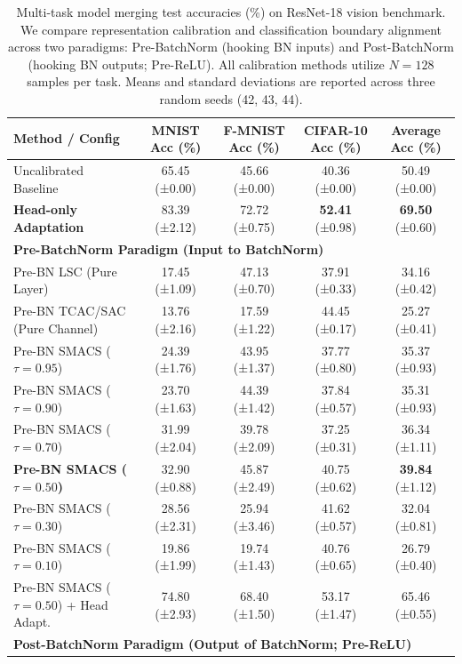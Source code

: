 \documentclass{article}
\theoremstyle{plain}
\theoremstyle{definition}
\theoremstyle{remark}
\begin{document}
\begin{table}[t]
\caption{Multi-task model merging test accuracies (\%) on ResNet-18 vision benchmark. We compare representation calibration and classification boundary alignment across two paradigms: Pre-BatchNorm (hooking BN inputs) and Post-BatchNorm (hooking BN outputs; Pre-ReLU). All calibration methods utilize $N=128$ samples per task. Means and standard deviations are reported across three random seeds (42, 43, 44).}
\label{tab:results}
\begin{center}
\begin{small}
\begin{sc}
\begin{tabular}{lcccc}
\toprule
Method / Config & MNIST Acc (\%) & F-MNIST Acc (\%) & CIFAR-10 Acc (\%) & Average Acc (\%) \\
\midrule
Uncalibrated Baseline & 65.45 (±0.00) & 45.66 (±0.00) & 40.36 (±0.00) & 50.49 (±0.00) \\
\textbf{Head-only Adaptation} & 83.39 (±2.12) & 72.72 (±0.75) & \textbf{52.41} (±0.98) & \textbf{69.50} (±0.60) \\
\midrule
\multicolumn{5}{l}{\textbf{Pre-BatchNorm Paradigm (Input to BatchNorm)}} \\
Pre-BN LSC (Pure Layer) & 17.45 (±1.09) & 47.13 (±0.70) & 37.91 (±0.33) & 34.16 (±0.42) \\
Pre-BN TCAC/SAC (Pure Channel) & 13.76 (±2.16) & 17.59 (±1.22) & 44.45 (±0.17) & 25.27 (±0.41) \\
Pre-BN SMACS ($\tau=0.95$) & 24.39 (±1.76) & 43.95 (±1.37) & 37.77 (±0.80) & 35.37 (±0.93) \\
Pre-BN SMACS ($\tau=0.90$) & 23.70 (±1.63) & 44.39 (±1.42) & 37.84 (±0.57) & 35.31 (±0.93) \\
Pre-BN SMACS ($\tau=0.70$) & 31.99 (±2.04) & 39.78 (±2.09) & 37.25 (±0.31) & 36.34 (±1.11) \\
\textbf{Pre-BN SMACS ($\tau=0.50$)} & 32.90 (±0.88) & 45.87 (±2.49) & 40.75 (±0.62) & \textbf{39.84} (±1.12) \\
Pre-BN SMACS ($\tau=0.30$) & 28.56 (±2.31) & 25.94 (±3.46) & 41.62 (±0.57) & 32.04 (±0.81) \\
Pre-BN SMACS ($\tau=0.10$) & 19.86 (±1.99) & 19.74 (±1.43) & 40.76 (±0.65) & 26.79 (±0.40) \\
Pre-BN SMACS ($\tau=0.50$) + Head Adapt. & 74.80 (±2.93) & 68.40 (±1.50) & 53.17 (±1.47) & 65.46 (±0.55) \\
\midrule
\multicolumn{5}{l}{\textbf{Post-BatchNorm Paradigm (Output of BatchNorm; Pre-ReLU)}} \\

\end{tabular}
\end{sc}
\end{small}
\end{center}
\end{table}
\end{document}
